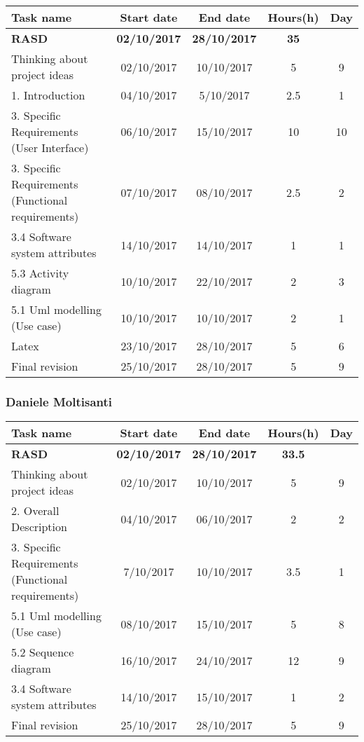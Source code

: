 \begin{table}[h!]
	\begin{tabular}{lcccc}
		\toprule
		\textbf{Task name} & \textbf{Start date} & \textbf{End date} & \textbf{Hours(h)} & \textbf{Day} \\
		\midrule
		\textbf{RASD} & \textbf{02/10/2017} & \textbf{28/10/2017} & \textbf{35} &  \\
		Thinking about project ideas & 02/10/2017 & 10/10/2017 & 5 & 9 \\
		1. Introduction & 04/10/2017 & 5/10/2017 & 2.5 & 1 \\
		3. Specific Requirements (User Interface) & 06/10/2017 & 15/10/2017 & 10 & 10 \\
		3. Specific Requirements (Functional requirements) & 07/10/2017 & 08/10/2017 & 2.5 & 2 \\
		3.4 Software system attributes & 14/10/2017 & 14/10/2017 & 1 & 1 \\
		5.3 Activity diagram & 10/10/2017 & 22/10/2017 & 2 & 3 \\
		5.1 Uml modelling (Use case) & 10/10/2017 & 10/10/2017 & 2 & 1 \\
		Latex & 23/10/2017 & 28/10/2017 & 5 & 6 \\
		\bottomrule
		Final revision & 25/10/2017 & 28/10/2017 & 5 & 9 \\
	\end{tabular}
\end{table}

\subsubsection{Daniele Moltisanti}

\begin{table}[h!]
	\begin{tabular}{lcccc}
		\toprule
		\textbf{Task name} & \textbf{Start date} & \textbf{End date} & \textbf{Hours(h)} & \textbf{Day} \\
		\midrule
		\textbf{RASD} & \textbf{02/10/2017} & \textbf{28/10/2017} & \textbf{33.5} & \\
		Thinking about project ideas & 02/10/2017 & 10/10/2017 & 5 & 9 \\
		2. Overall Description & 04/10/2017 & 06/10/2017 & 2 & 2 \\
		3. Specific Requirements (Functional requirements) & 7/10/2017 & 10/10/2017 & 3.5 & 1 \\
		5.1 Uml modelling (Use case) & 08/10/2017 & 15/10/2017 & 5 & 8 \\
		5.2 Sequence diagram & 16/10/2017 & 24/10/2017 & 12 & 9 \\
		3.4 Software system attributes & 14/10/2017 & 15/10/2017 & 1 & 2 \\
		\bottomrule
		Final revision & 25/10/2017 & 28/10/2017 & 5 & 9 \\
	\end{tabular}
\end{table}
